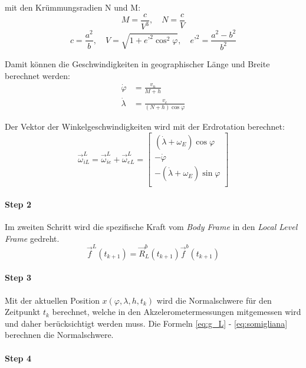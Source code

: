 mit den Krümmungsradien N und M:
\begin{equation}
	M = \frac{c}{V^3}, \quad N = \frac{c}{V}
\end{equation}
\begin{equation}
 	c = \frac{a^2}{b}, \quad V=\sqrt{1+e’^2\cos^2{\varphi}}, \quad e’^2 = \frac{a^2-b^2}{b^2}
\end{equation}

Damit können die Geschwindigkeiten in geographischer Länge und Breite berechnet werden:
\begin{align}
 	\dot{\varphi} & = \frac{v_n}{M+h}\\
	\dot{\lambda} & = \frac{v_e}{(N+h)\cos{\varphi}}
\end{align}

Der Vektor der Winkelgeschwindigkeiten wird mit der Erdrotation berechnet:
\begin{equation}
 	\vec{\omega}_{iL}^L = \vec{\omega}_{ie}^L +\vec{\omega}_{eL}^L = 
	\begin{bmatrix}
		(\dot{\lambda}+\omega_E)\cos{\varphi}\\
		-\dot{\varphi}\\
		-(\dot{\lambda}+\omega_E)\sin{\varphi}\\
	\end{bmatrix}
\end{equation}

\paragraph{Step 2}

Im zweiten Schritt wird die spezifische Kraft vom \textit{Body Frame} in den \textit{Local Level Frame} gedreht.
\begin{equation}
 	\vec{f}^L(t_{k+1}) = \vec{R}_L^b(t_{k+1}) \vec{f}^b(t_{k+1})
\end{equation}

\paragraph{Step 3}

Mit der aktuellen Position $x(\varphi,\lambda,h,t_k)$ wird die Normalschwere für den Zeitpunkt $t_k$ berechnet, welche in den Akzelerometermessungen mitgemessen wird und daher berücksichtigt werden muss. Die Formeln \ref{eq:g_L} - \ref{eq:somigliana} berechnen die Normalschwere.

\paragraph{Step 4}

